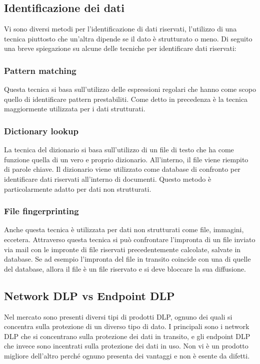 \subsection{Identificazione dei dati}
    Vi sono diversi metodi per l'identificazione di dati riservati, l'utilizzo di una tecnica piuttosto che
    un'altra dipende se il dato è strutturato o meno. Di seguito 
    una breve spiegazione su alcune delle tecniche per identificare dati riservati: \cite{DLP4}
    \subsubsection{Pattern matching}
    Questa tecnica si basa sull'utilizzo delle espressioni regolari che hanno come scopo quello
    di identificare pattern prestabiliti. Come detto in precedenza è la tecnica maggiormente 
    utilizzata per i dati strutturati. 

    \subsubsection{Dictionary lookup}
    La tecnica del dizionario si basa sull'utilizzo di un file di testo che ha come funzione quella
    di un vero e proprio dizionario. All'interno, il file viene riempito di parole chiave. 
    Il dizionario viene utilizzato come database di confronto per identificare dati riservati all'interno 
    di documenti. Questo metodo è particolarmente adatto per dati non strutturati.

    \subsubsection{File fingerprinting}
    Anche questa tecnica è utilizzata per dati non strutturati come file, immagini, eccetera.
    Attraverso questa tecnica si può confrontare l'impronta di un file inviato via mail con 
    le impronte di file riservati precedentemente calcolate, salvate in database.
    Se ad esempio l'impronta del file in transito coincide con una di quelle del database,
    allora il file è un file riservato e si deve bloccare la sua diffusione.

\subsection{Network DLP vs Endpoint DLP}
    Nel mercato sono presenti diversi tipi di prodotti DLP, ognuno dei quali si concentra sulla protezione
    di un diverso tipo di dato. I principali sono i network DLP che si concentrano sulla protezione dei dati
    in transito, e gli endpoint DLP che invece sono incentrati sulla protezione dei dati in uso.
    Non vi è un prodotto migliore dell'altro perché ognuno presenta dei vantaggi e non è esente da difetti.

